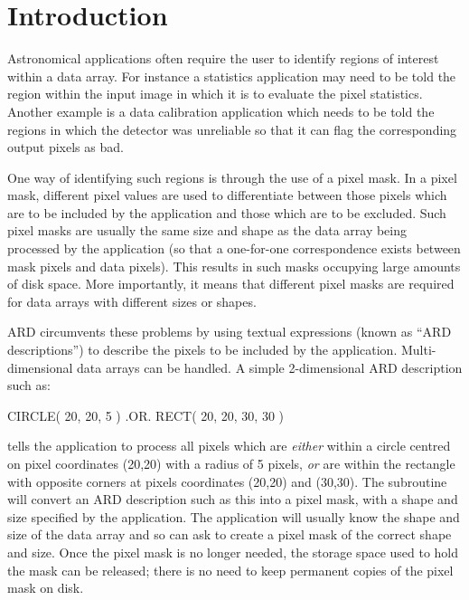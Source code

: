 \documentclass[11pt,nolof]{starlink}
\begin{document}
\scfrontmatter

\section{Introduction}

Astronomical applications often require the user to identify regions of interest
within a data array. For instance a statistics application may need to be told
the region within the input image in which it is to evaluate the pixel
statistics. Another example is a data calibration application which needs
to be told the regions in which the detector was unreliable so that it can flag
the corresponding output pixels as bad.

One way of identifying such regions is through the use of a pixel mask. In a
pixel mask, different pixel values are used to differentiate between those
pixels which are to be included by the application and those which are to be
excluded. Such pixel masks are usually the same size and shape as the data array
being processed by the application (so that a one-for-one correspondence exists
between mask pixels and data pixels). This results in such masks occupying large
amounts of disk space. More importantly, it means that different pixel masks are
required for data arrays with different sizes or shapes.

ARD circumvents these problems by using textual expressions (known as ``ARD
descriptions'') to describe the pixels to be included by the application.
Multi-dimensional data arrays can be handled. A simple 2-dimensional ARD
description such as:

\small
\begin{terminalv}
      CIRCLE( 20, 20, 5 ) .OR. RECT( 20, 20, 30, 30 )
\end{terminalv}
\normalsize

tells the application to process all pixels which are \emph{either} within a
circle centred on pixel coordinates (20,20) with a radius of 5 pixels,
\emph{or} are within the rectangle with opposite corners at pixels coordinates
(20,20) and (30,30). The 
subroutine will convert an ARD description such as this into a pixel mask, with
a shape and size specified by the application. The application will usually know
the shape and size of the data array and so can ask  to create a pixel
mask of the correct shape and size. Once the pixel mask is no longer needed,
the storage space used to hold the mask can be released; there is no need to
keep permanent copies of the pixel mask on disk.
\end{document}
